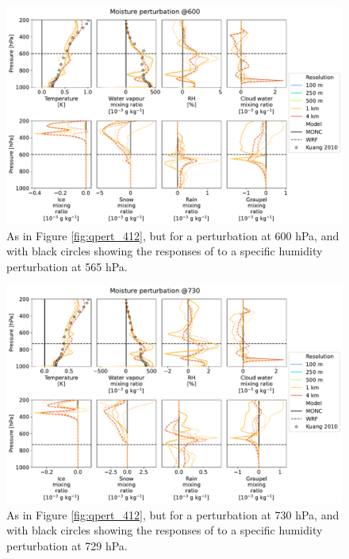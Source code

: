 \documentclass[draft]{agujournal2019}
\begin{document}
\begin{figure}[pth]
    \noindent\includegraphics[width=\textwidth]{figures/pert_diffs_q_0.0002_@600}
    \caption{As in Figure \ref{fig:qpert_412}, but for a perturbation at 600
    hPa, and with black circles showing the responses of 
    to a specific humidity perturbation at 565 hPa.}
    \label{fig:qpert_600}
\end{figure}

\begin{figure}[pth]
    \noindent\includegraphics[width=\textwidth]{figures/pert_diffs_q_0.0002_@730}
    \caption{As in Figure \ref{fig:qpert_412}, but for a perturbation at 730
    hPa, and with black circles showing the responses of 
    to a specific humidity perturbation at 729 hPa.}
    \label{fig:qpert_730}
\end{figure}
\end{document}
